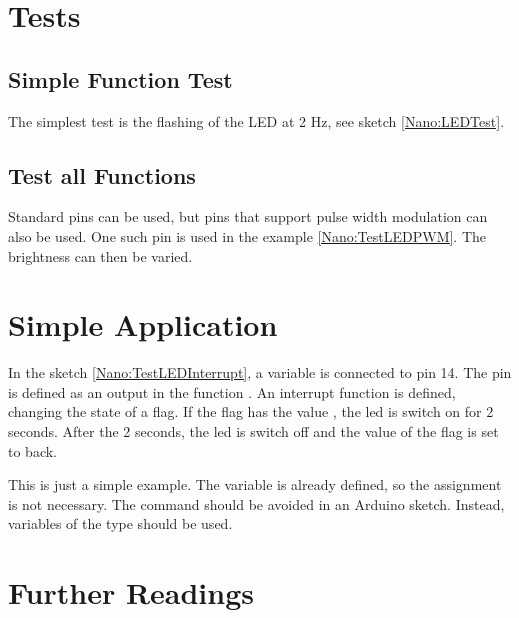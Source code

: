 \section{Tests}

\subsection{Simple Function Test}

The simplest test is the flashing of the LED at 2 Hz, see sketch \ref{Nano:LEDTest}.

{
    \label{Nano:LEDTest}
}



\subsection{Test all Functions}

Standard pins can be used, but pins that support pulse width modulation can also be used. One such pin is used in the example \ref{Nano:TestLEDPWM}. The brightness can then be varied.

{
    \label{Nano:TestLEDPWM}
}




\section{Simple Application}

In the sketch \ref{Nano:TestLEDInterrupt}, a variable is connected to pin 14. The pin is defined as an output in the function .
An interrupt function is defined, changing the state of a flag. If the flag has the value , the led is switch on for 2 seconds. After the 2 seconds, the led is switch off and the value of the flag is set to  back.


{
    \label{Nano:TestLEDInterrupt}
}

\bigskip

This is just a simple example. The variable  is already defined, so the assignment is not necessary. The command  should be avoided in an Arduino sketch. Instead, variables of the type  should be used.


\section{Further Readings}











